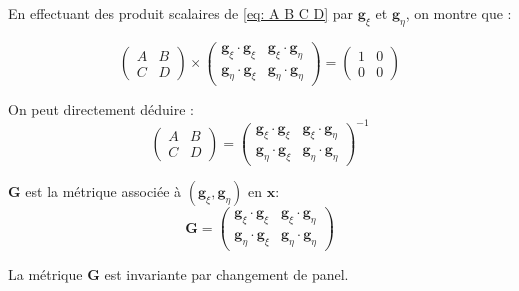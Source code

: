 En effectuant des produit scalaires de \eqref{eq: A B C D} par $\mathbf{g}_{\xi}$ et $\mathbf{g}_{\eta}$, on montre que :

\begin{equation}
\begin{pmatrix}
A & B \\ C &  D
\end{pmatrix}
\times
\begin{pmatrix}
\mathbf{g}_{\xi} \cdot \mathbf{g}_{\xi} & \mathbf{g}_{\xi} \cdot \mathbf{g}_{\eta} \\
\mathbf{g}_{\eta} \cdot \mathbf{g}_{\xi} & \mathbf{g}_{\eta} \cdot \mathbf{g}_{\eta}
\end{pmatrix}
= \begin{pmatrix}
1 & 0 \\ 0 &  0
\end{pmatrix}
\end{equation}

On peut directement déduire :
\begin{equation}
\begin{pmatrix}
A & B \\ C &  D
\end{pmatrix} 
=
\begin{pmatrix}
\mathbf{g}_{\xi} \cdot \mathbf{g}_{\xi} & \mathbf{g}_{\xi} \cdot \mathbf{g}_{\eta} \\
\mathbf{g}_{\eta} \cdot \mathbf{g}_{\xi} & \mathbf{g}_{\eta} \cdot \mathbf{g}_{\eta}
\end{pmatrix}^{-1}
\end{equation}


\begin{definition}
$\mathbf{G}$ est la métrique associée à $(\mathbf{g}_{\xi}, \mathbf{g}_{\eta})$ en $\mathbf{x}$:
\begin{equation}
\mathbf{G} = \begin{pmatrix}
\mathbf{g}_{\xi} \cdot \mathbf{g}_{\xi} & \mathbf{g}_{\xi} \cdot \mathbf{g}_{\eta} \\
\mathbf{g}_{\eta} \cdot \mathbf{g}_{\xi} & \mathbf{g}_{\eta} \cdot \mathbf{g}_{\eta}
\end{pmatrix}
\end{equation}
\end{definition}

\begin{proposition}
La métrique $\mathbf{G}$ est invariante par changement de panel.
\end{proposition}

